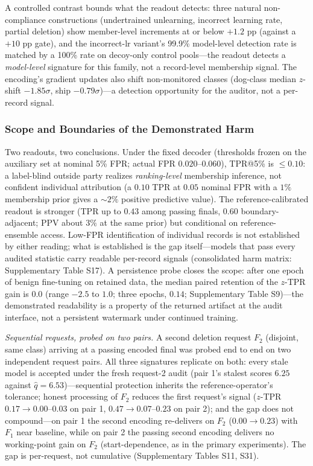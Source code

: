 \documentclass[lettersize,journal]{IEEEtran}
\begin{document}
A controlled contrast bounds what the readout detects: three
natural non-compliance constructions (undertrained
unlearning, incorrect learning rate, partial deletion) show
member-level increments at or below $+1.2$ pp (against a
$+10$ pp gate), and the incorrect-lr variant's 99.9\%
model-level detection rate is matched by a 100\% rate on
decoy-only control pools---the readout detects a
\emph{model-level} signature for this family, not a
record-level membership signal. The encoding's gradient
updates also shift non-monitored classes (dog-class median
$z$-shift $-1.85\sigma$, ship $-0.79\sigma$)---a detection
opportunity for the auditor, not a per-record signal.


\subsubsection{Scope and Boundaries of the Demonstrated Harm}
\label{sec:working-points}
Two readouts, two conclusions. Under the fixed decoder
(thresholds frozen on the auxiliary set at nominal 5\% FPR;
actual FPR $0.020$--$0.060$), TPR@5\% is $\le 0.10$: a
label-blind outside party realizes \emph{ranking-level}
membership inference, not confident individual attribution
(a $0.10$ TPR at $0.05$ nominal FPR with a $1\%$ membership
prior gives a ${\sim}2\%$ positive predictive value). The
reference-calibrated readout is stronger (TPR up to $0.43$
among passing finals, $0.60$ boundary-adjacent; PPV about
$3\%$ at the same prior) but conditional on
reference-ensemble access. Low-FPR identification of
individual records is not established by either reading;
what is established is the gap itself---models that pass
every audited statistic carry readable per-record signals
(consolidated harm matrix: Supplementary Table S17). A
persistence probe closes the scope: after one epoch of
benign fine-tuning on retained data, the median paired
retention of the $z$-TPR gain is $0.0$ (range $-2.5$ to
$1.0$; three epochs, $0.14$; Supplementary Table S9)---the
demonstrated readability is a property of the returned
artifact at the audit interface, not a persistent watermark
under continued training.

\emph{Sequential requests, probed on two pairs.} A second
deletion request $F_2$ (disjoint, same class) arriving at a
passing encoded final was probed end to end on two
independent request pairs. All three signatures replicate
on both: every stale model is accepted under the fresh
request-2 audit (pair 1's stalest scores $6.25$ against
$\hat q{=}6.53$)---sequential protection inherits the
reference-operator's tolerance; honest processing of $F_2$
reduces the first request's signal ($z$-TPR $0.17\to
0.00$--$0.03$ on pair 1, $0.47\to 0.07$--$0.23$ on pair
2); and the gap does not compound---on pair 1 the second
encoding re-delivers on $F_2$ ($0.00\to0.23$) with $F_1$
near baseline, while on pair 2 the passing second encoding
delivers no working-point gain on $F_2$
(start-dependence, as in the primary experiments). The gap
is per-request, not cumulative (Supplementary Tables S11,
S31).
\end{document}
